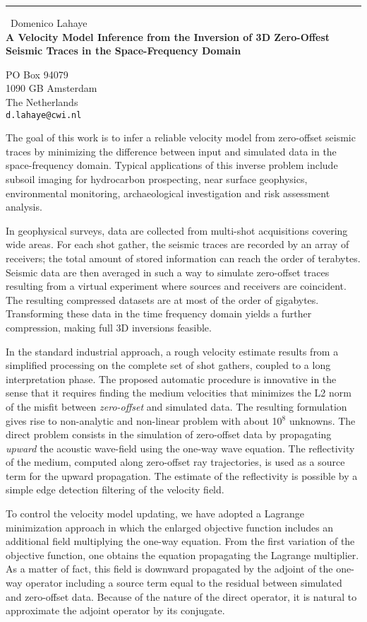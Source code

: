 \documentclass{report}
\begin{document}
\begin{center}
\rule{6in}{1pt} \
{\large Domenico Lahaye \\
{\bf A Velocity Model Inference from the Inversion of 3D Zero-Offest Seismic Traces in the Space-Frequency Domain}}

PO Box 94079  \\ 1090 GB Amsterdam  \\ The Netherlands
\\
{\tt d.lahaye@cwi.nl}\end{center}

The goal of this work is to infer a reliable velocity model from zero-offset
seismic traces by minimizing the difference between input and simulated data
in the space-frequency domain. Typical applications of this inverse problem
include subsoil imaging for hydrocarbon prospecting, near surface
geophysics, environmental monitoring, archaeological investigation and
risk assessment
analysis.

In geophysical surveys, data are
collected from multi-shot acquisitions covering wide areas. For each shot
gather, the seismic traces are recorded by an array of receivers; the total
amount of stored information can reach the order of terabytes. Seismic data are
then averaged in such a way to simulate zero-offset traces resulting from a
virtual experiment where sources and receivers are coincident. The resulting
compressed datasets are at most of the order of gigabytes. Transforming these
data in the time frequency domain yields a further compression, making full 3D
inversions feasible.

In the standard industrial approach, a rough velocity estimate results from a
simplified processing on the complete set of shot gathers, coupled to a long
interpretation phase. The proposed automatic procedure is innovative in the
sense that it requires finding the medium velocities that minimizes the L2
norm of the misfit between {\em zero-offset} and simulated data. The resulting
formulation gives rise to non-analytic and non-linear problem with about
10$^8$ unknowns. The direct problem consists in the simulation of zero-offset
data by propagating {\em upward} the acoustic wave-field using the one-way
wave equation. The reflectivity of the medium, computed along zero-offset ray
trajectories, is used as a source term for the upward propagation. The
estimate of the reflectivity is possible by a simple edge detection
filtering of the velocity field.

To control the velocity model updating,
we have adopted a Lagrange minimization approach in which the enlarged
objective function includes an additional field multiplying the one-way
equation. From the first variation of the objective function, one obtains the
equation propagating the Lagrange multiplier. As a matter of fact, this field
is downward propagated by the adjoint of the one-way operator including a
source term equal to the residual between simulated and zero-offset
data. Because of the nature of the direct operator, it is natural to
approximate the adjoint operator by its conjugate.
\end{document}
